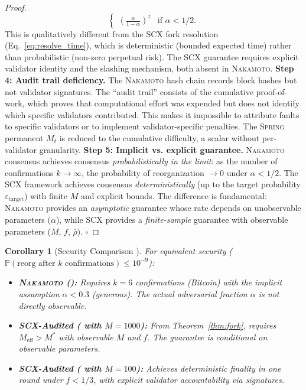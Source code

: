 \documentclass[11pt,a4paper]{article}
\newtheorem{corollary}[theorem]{Corollary}
\theoremstyle{definition}
\newcommand{\Spring}{\textsc{Spring}}
\newcommand{\SCX}{\textsc{SCX}}
\newcommand{\Pbb}{\mathbb{P}}
\newcommand{\mthreshold}{M^{*}}
\newcommand{\Nakamoto}{\textsc{Nakamoto}}
\newcommand{\PoW}{\mathrm{PoW}}
\newcommand{\PoS}{\mathrm{PoS}}
\newcommand{\PBFT}{\mathrm{PBFT}}
\begin{document}
\begin{proof}
\begin{equation}
\begin{cases}
        \left(\frac{\alpha}{1-\alpha}\right)^z & \text{if } \alpha < 1/2.
    \end{cases}
    \label{eq:nakamoto_overtake}
\end{equation}
This is qualitatively different from the \SCX{} fork resolution (Eq.~\ref{eq:resolve_time}), which is deterministic (bounded expected time) rather than probabilistic (non-zero perpetual risk). The \SCX{} guarantee requires explicit validator identity and the slashing mechanism, both absent in \Nakamoto{}.
\textbf{Step 4: Audit trail deficiency.} The \Nakamoto{} hash chain records block hashes but not validator signatures. The ``audit trail'' consists of the cumulative proof-of-work, which proves that computational effort was expended but does not identify which specific validators contributed. This makes it impossible to attribute faults to specific validators or to implement validator-specific penalties. The \Spring{} permanent $M_t$ is reduced to the cumulative difficulty, a scalar without per-validator granularity.
\textbf{Step 5: Implicit vs. explicit guarantee.} \Nakamoto{} consensus achieves consensus \textit{probabilistically in the limit}: as the number of confirmations $k \to \infty$, the probability of reorganization $\to 0$ under $\alpha < 1/2$. The \SCX{} framework achieves consensus \textit{deterministically} (up to the target probability $\varepsilon_{\mathrm{target}}$) with finite $M$ and explicit bounds. The difference is fundamental: \Nakamoto{} provides an \textit{asymptotic} guarantee whose rate depends on unobservable parameters ($\alpha$), while \SCX{} provides a \textit{finite-sample} guarantee with observable parameters ($M$, $f$, $\bar{\rho}$). $\square$
\end{proof}
\begin{corollary}[Security Comparison ]
\label{cor:nakamoto_comparison}
For equivalent security ($\Pbb(\text{reorg after $k$ confirmations}) \leq 10^{-9}$):
\begin{itemize}
    \item \textbf{\Nakamoto{} (\PoW{}):} Requires $k = 6$ confirmations (Bitcoin) with the implicit assumption $\alpha < 0.3$ (generous). The actual adversarial fraction $\alpha$ is not directly observable.
    \item \textbf{\SCX{}-Audited (\PoS{} with $M = 1000$):} From Theorem~\ref{thm:fork}, requires $M_{\mathrm{eff}} > \mthreshold$ with observable $M$ and $f$. The guarantee is conditional on observable parameters.
    \item \textbf{\SCX{}-Audited (\PBFT{} with $M = 100$):} Achieves deterministic finality in one round under $f < 1/3$, with explicit validator accountability via signatures.
\end{itemize}
\end{corollary}
\end{document}
